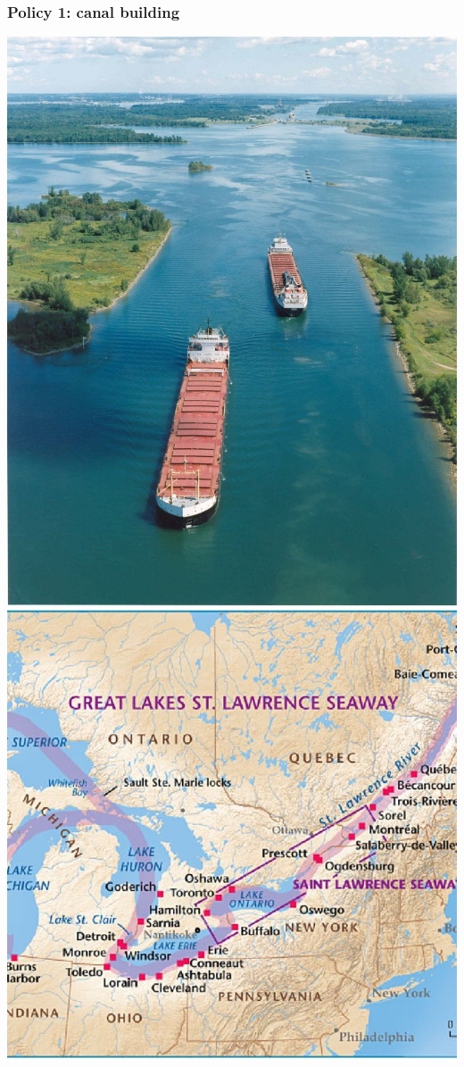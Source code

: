 \documentclass[aspectratio=169]{beamer}
\theoremstyle{principle}
\begin{document}
\begin{frame}
\frametitle{Policy 1: canal building}
    \begin{center}
     \includegraphics[scale=0.8]{st_lawrence_seaway.jpeg}
          \includegraphics[scale=0.9]{st_lawrence_seaway_map.jpg}
     \end{center}
\end{frame}
\end{document}
